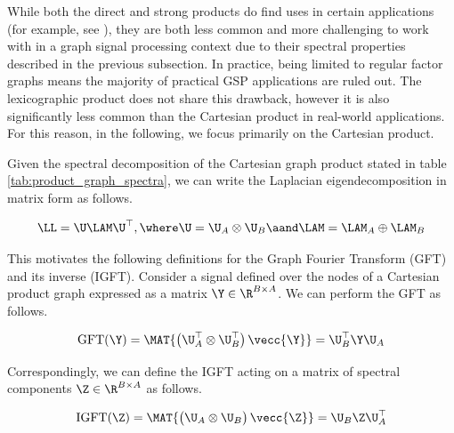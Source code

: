 While both the direct and strong products do find uses in certain applications (for example, see \citep{Kaveh2011}), they are both less common and more challenging to work with in a graph signal processing context due to their spectral properties described in the previous subsection. In practice, being limited to regular factor graphs means the majority of practical GSP applications are ruled out. The lexicographic product does not share this drawback, however it is also significantly less common than the Cartesian product in real-world applications. For this reason, in the following, we focus primarily on the Cartesian product. 

Given the spectral decomposition of the Cartesian graph product stated in table \ref{tab:product_graph_spectra}, we can write the Laplacian eigendecomposition in matrix form as follows. 

\begin{equation}
    \LL = \U \LAM \U^\top, \where \U = \U_A \otimes \U_B \aand \LAM = \LAM_A \oplus \LAM_B
\end{equation}

This motivates the following definitions for the Graph Fourier Transform (GFT) and its inverse (IGFT). Consider a signal defined over the nodes of a Cartesian product graph expressed as a matrix $\Y \in \R^{B \times A}$. We can perform the GFT as follows. 



\begin{equation}
    \text{GFT}(\Y) = \MAT{\big( \U_A^\top \otimes \U_B^\top \big) \, \vecc{\Y}} = \U_B^\top \Y \U_A
\end{equation}

Correspondingly, we can define the IGFT acting on a matrix of spectral components $\Z \in \R^{B \times A}$ as follows. 

\begin{equation}
    \text{IGFT}(\Z) = \MAT{\big( \U_A \otimes \U_B \big)\,\vecc{\Z}} = \U_B \Z \U_A^\top
\end{equation}


